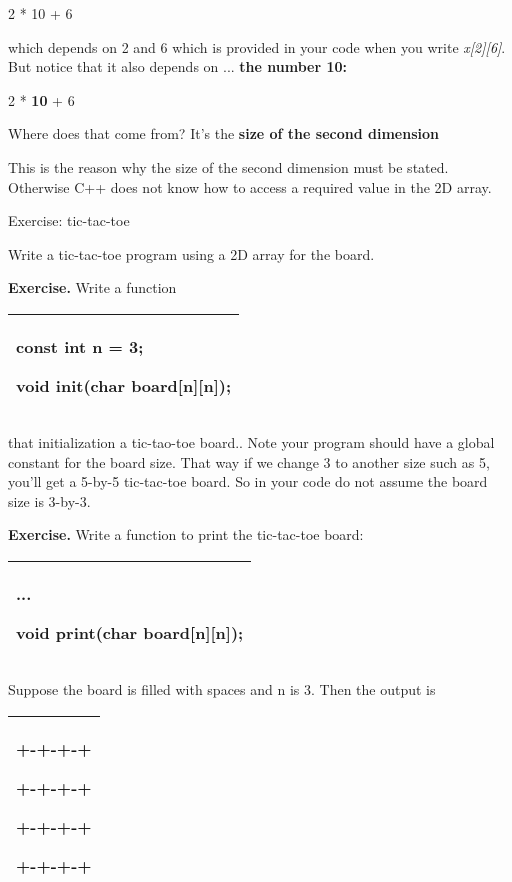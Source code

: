 \documentclass[
]{article}
\begin{document}
2 * 10 + 6

which depends on 2 and 6 which is provided in your code when you write
\emph{x{[}2{]}{[}6{]}}. But notice that it also depends on ...
\textbf{the number 10:}

2 * \textbf{10} + 6

Where does that come from? It's the \textbf{size of the second
dimension}

This is the reason why the size of the second dimension must be stated.
Otherwise C++ does not know how to access a required value in the 2D
array.

Exercise: tic-tac-toe

Write a tic-tac-toe program using a 2D array for the board.

\textbf{Exercise.} Write a function

\begin{longtable}[]{@{}l@{}}
\toprule
\endhead
\begin{minipage}[t]{0.97\columnwidth}\raggedright
const int n = 3;

void init(char board{[}n{]}{[}n{]});\strut
\end{minipage}\tabularnewline
\bottomrule
\end{longtable}

that initialization a tic-tao-toe board.. Note your program should have
a global constant for the board size. That way if we change 3 to another
size such as 5, you'll get a 5-by-5 tic-tac-toe board. So in your code
do not assume the board size is 3-by-3.

\textbf{Exercise.} Write a function to print the tic-tac-toe board:

\begin{longtable}[]{@{}l@{}}
\toprule
\endhead
\begin{minipage}[t]{0.97\columnwidth}\raggedright
...

void print(char board{[}n{]}{[}n{]});\strut
\end{minipage}\tabularnewline
\bottomrule
\end{longtable}

Suppose the board is filled with spaces and n is 3. Then the output is

\begin{longtable}[]{@{}l@{}}
\toprule
\endhead
\begin{minipage}[t]{0.97\columnwidth}\raggedright
+-+-+-+

\textbar{} \textbar{} \textbar{} \textbar{}

+-+-+-+

\textbar{} \textbar{} \textbar{} \textbar{}

+-+-+-+

\textbar{} \textbar{} \textbar{} \textbar{}

+-+-+-+\strut
\end{minipage}\tabularnewline
\bottomrule
\end{longtable}
\end{document}
